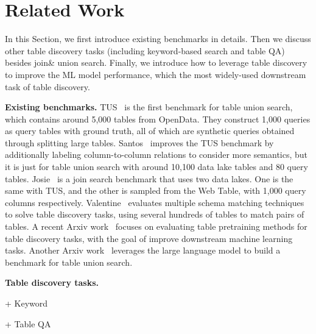 \section{Related Work}
In this Section, we first introduce existing  benchmarks in details. Then we discuss other table discovery tasks  (including keyword-based search and table QA) besides join\& union search. Finally, we introduce how to leverage table discovery to improve the ML model performance, which the most widely-used downstream task of table discovery. 



\noindent \textbf{Existing benchmarks.} 
TUS~\cite{TUS} is the  first benchmark for table union search, which contains around 5,000 tables from OpenData. They construct 1,000 queries  as query tables with ground truth, all of which are synthetic queries obtained through splitting large tables. 
%
Santos~\cite{Santos} improves the TUS benchmark by additionally labeling column-to-column relations to consider more semantics, but it is just for table union search with around 10,100 data lake tables and 80 query tables. 
%
Josie~\cite{Josie} is a join search benchmark that uses two data lakes. One is the same with TUS, and the other is sampled from the Web Table, with 1,000 query columns respectively. 
%
Valentine~\cite{valentine} evaluates multiple schema matching techniques to solve table discovery tasks, using several hundreds of tables to match pairs of tables. 
%
A recent Arxiv work~\cite{arxiv} focuses on evaluating table pretraining methods for table
 discovery tasks, with the goal of improve downstream machine learning tasks. 
%
Another Arxiv work~\cite{arxiv} leverages the large language model to build a benchmark for table union search.

\noindent \textbf{Table discovery tasks.}

+ Keyword

+ Table QA


